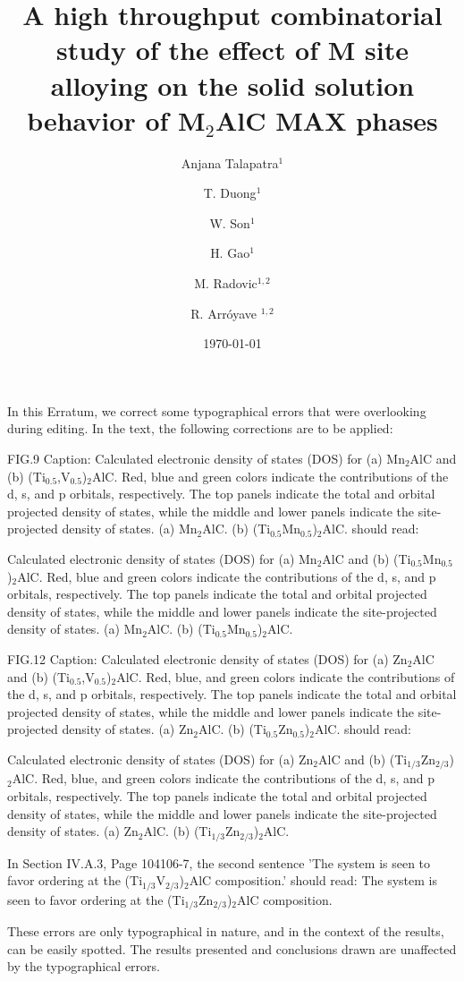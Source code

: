 \documentclass[erratum,amsmath,amssymb,aps, prb,showkeys]{revtex4-1}
\begin{document}
\title{A high throughput combinatorial study of the effect of M site alloying on the solid solution behavior of M\texorpdfstring{$_2$}{}AlC MAX phases}
	\author{Anjana Talapatra$^{1}$}
	\author{T. Duong$^{1}$}
	\author{W. Son$^{1}$}
	\author{H. Gao$^{1}$}
	\author{M. Radovic$^{1,2}$}
	\author{R. Arr\'{o}yave $^{1,2}$}
	\date{\today}

\maketitle

In this Erratum, we correct some typographical errors that were overlooking during editing.
In the text, the following corrections are to be applied:

FIG.9 Caption: Calculated electronic density of states (DOS) for (a) Mn$_2$AlC and (b) (Ti$_{0.5}$,V$_0.5$)$_2$AlC. Red, blue and green colors indicate the contributions of the d, s, and p orbitals, respectively. The top panels indicate the total and orbital projected density of states, while the middle and lower panels indicate the site-projected density of states. (a) Mn$_2$AlC. (b) (Ti$_{0.5}$Mn$_{0.5}$)$_2$AlC. should read:

Calculated electronic density of states (DOS) for (a) Mn$_2$AlC and (b) (Ti$_{0.5}$Mn$_{0.5}$)$_2$AlC. Red, blue and green colors indicate the contributions of the d, s, and p orbitals, respectively. The top panels indicate the total and orbital projected density of states, while the middle and lower panels indicate the site-projected density of states. (a) Mn$_2$AlC. (b) (Ti$_{0.5}$Mn$_{0.5}$)$_2$AlC.


FIG.12 Caption: Calculated electronic density of states (DOS) for (a) Zn$_2$AlC and (b) (Ti$_0.5$,V$_0.5$)$_2$AlC. Red, blue, and green colors indicate the contributions of the d, s, and p orbitals, respectively. The top panels indicate the total and orbital projected density of states, while the middle and lower panels indicate the site-projected density of states. (a) Zn$_2$AlC. (b) (Ti$_{0.5}$Zn$_{0.5}$)$_2$AlC. should read:

Calculated electronic density of states (DOS) for (a) Zn$_2$AlC and (b) (Ti$_{1/3}$Zn$_{2/3}$)$_2$AlC. Red, blue, and green colors indicate the contributions of the d, s, and p orbitals, respectively. The top panels indicate the total and orbital projected density of states, while the middle and lower panels indicate the site-projected density of states. (a) Zn$_2$AlC. (b) (Ti$_{1/3}$Zn$_{2/3}$)$_2$AlC.

In Section IV.A.3, Page 104106-7, the second sentence 'The system is seen to favor ordering at the (Ti$_{1/3}$V$_{2/3}$)$_2$AlC  composition.' should read: The system is seen to favor ordering at the (Ti$_{1/3}$Zn$_{2/3}$)$_2$AlC composition.

These errors are only typographical in nature, and in the context of the results, can be easily spotted. The results presented and conclusions drawn are unaffected by the typographical errors.
\end{document}
